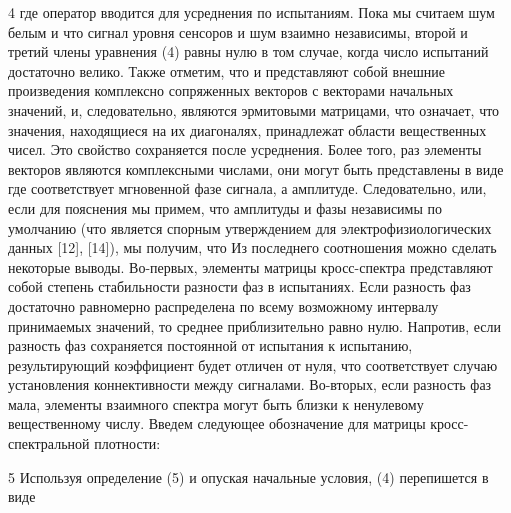 4
где оператор вводится для усреднения по испытаниям. Пока мы считаем шум белым и что сигнал уровня сенсоров   и шум взаимно независимы, второй и третий члены уравнения (4) равны нулю в том случае, когда число испытаний достаточно велико. Также отметим, что и представляют собой внешние произведения комплексно сопряженных векторов с векторами начальных значений, и, следовательно, являются эрмитовыми матрицами, что означает, что значения, находящиеся на их диагоналях, принадлежат области вещественных чисел. Это свойство сохраняется после усреднения.
Более того, раз элементы векторов являются комплексными числами, они могут быть представлены в виде где соответствует мгновенной фазе сигнала, а амплитуде. Следовательно, или, если для пояснения мы примем, что амплитуды и фазы независимы по умолчанию (что является спорным утверждением для электрофизиологических данных [12], [14]), мы получим, что Из последнего соотношения можно сделать некоторые выводы. Во-первых, элементы матрицы кросс-спектра представляют собой степень стабильности разности фаз в испытаниях. Если разность фаз достаточно равномерно распределена по всему возможному интервалу принимаемых значений, то среднее приблизительно равно нулю. Напротив, если разность фаз сохраняется постоянной от испытания к испытанию, результирующий коэффициент будет отличен от нуля, что соответствует случаю установления коннективности между сигналами. Во-вторых, если разность фаз мала, элементы взаимного спектра могут быть близки к ненулевому вещественному числу.
Введем следующее обозначение для матрицы кросс-спектральной плотности: 

5
Используя определение (5) и опуская начальные условия, (4) перепишется в виде

